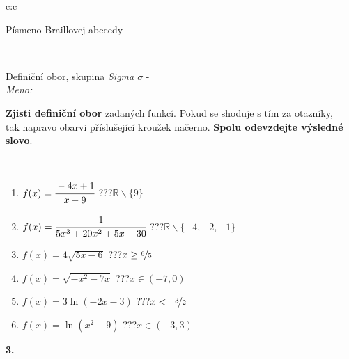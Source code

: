\documentclass[10pt]{report}
\begin{document}
\begin{tabular}{c:c}
\begin{minipage}[c][104.5mm][t]{0.5\linewidth}
\begin{center}
\begin{minipage}{0.20\linewidth}
\begin{center}
{\small Písmeno Braillovej abecedy}
\end{center}
\end{minipage}
\end{center}
\end{minipage}
\\ \hdashline
\begin{minipage}[c][104.5mm][t]{0.5\linewidth}
\begin{center}
\vspace{7mm}
{\huge Definiční obor, skupina \textit{Sigma $\sigma$} -}\\[5mm]
\textit{Meno:}\phantom{xxxxxxxxxxxxxxxxxxxxxxxxxxxxxxxxxxxxxxxxxxxxxxxxxxxxxxxxxxxxxxxxx}\\[5mm]
\begin{minipage}{0.95\linewidth}
\textbf{Zjisti definiční obor} zadaných funkcí. Pokud se shoduje s tím za otazníky,\\tak napravo obarvi příslušející kroužek načerno. \textbf{Spolu odevzdejte výsledné slovo}.
\end{minipage}
\\[1mm]
\begin{minipage}{0.79\linewidth}
\begin{center}
\begin{varwidth}{\linewidth}
\begin{enumerate}
\normalsizerrr
\item $f(x)=\cfrac{-4x+1}{x-9}$\quad \dotfill\; ???\;\dotfill \quad $\mathbb{R}\smallsetminus\{9\}$
\item $f(x)=\cfrac{1}{5x^3+20x^2+5x-30}$\quad \dotfill\; ???\;\dotfill \quad $\mathbb{R}\smallsetminus\{-4,-2,-1\}$
\item $f(x)=4\sqrt{5x-6}$\quad \dotfill\; ???\;\dotfill \quad $x\geq\nicefrac{6}{5}$
\item $f(x)=\sqrt{-x^2-7x}$\quad \dotfill\; ???\;\dotfill \quad $x\in(-7 , 0)$
\item $f(x)=3\ln{(-2x-3)}$\quad \dotfill\; ???\;\dotfill \quad $x<\nicefrac{-3}{2}$
\item $f(x)=\ln{(x^2-9)}$\quad \dotfill\; ???\;\dotfill \quad $x\in(-3 , 3)$
\end{enumerate}
\end{varwidth}
\end{center}
\end{minipage}
\begin{minipage}{0.20\linewidth}
\begin{center}
{\Huge\bfseries 3.} \\[2mm]

\end{center}
\end{minipage}
\end{center}
\end{minipage}
\end{tabular}
\end{document}
